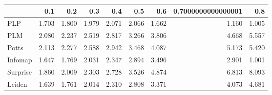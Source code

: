 \begin{tabular}{lrrrrrrrr}
\toprule
{} &   0.1 &   0.2 &   0.3 &   0.4 &   0.5 &   0.6 & 0.7000000000000001 &   0.8 \\
\midrule
PLP      & 1.703 & 1.800 & 1.979 & 2.071 & 2.066 & 1.662 &              1.160 & 1.005 \\
PLM      & 2.080 & 2.237 & 2.519 & 2.817 & 3.266 & 3.806 &              4.668 & 5.557 \\
Potts    & 2.113 & 2.277 & 2.588 & 2.942 & 3.468 & 4.087 &              5.173 & 5.420 \\
Infomap  & 1.647 & 1.769 & 2.031 & 2.347 & 2.894 & 3.496 &              2.901 & 1.001 \\
Surprise & 1.860 & 2.009 & 2.303 & 2.728 & 3.526 & 4.874 &              6.813 & 8.093 \\
Leiden   & 1.639 & 1.761 & 2.014 & 2.310 & 2.808 & 3.371 &              4.073 & 4.681 \\
\bottomrule
\end{tabular}

